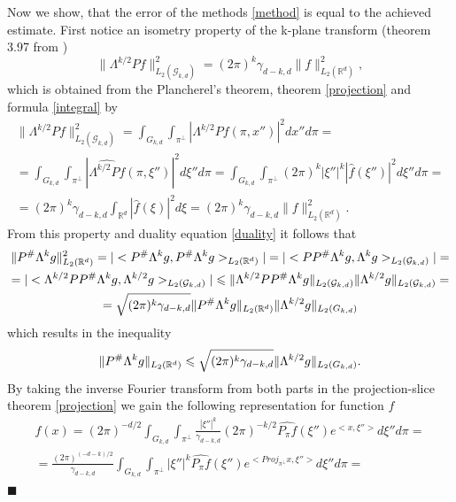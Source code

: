 \documentclass[12pt]{iopart}
\newenvironment{proof}
{\par\noindent{\bf Proof}}
{\hfill$\scriptstyle\blacksquare$}
\begin{document}
\begin{proof}
		Now we show, that the error of the methods \eqref{method} is equal to the achieved estimate. First notice an isometry property of the k-plane transform (theorem 3.97 from \cite{MA})
		$$\|\Lambda^{k/2}Pf\|^2_{L_2(\mathcal G_{k,d})}=(2\pi)^k\gamma_{d-k,d}\|f\|^2_{L_2(\mathbb R^d)},$$
		which is obtained from the Plancherel's theorem, theorem \ref{projection} and formula \eqref{integral} by    
		\begin{multline*}
		\|\Lambda^{k/2}Pf\|^2_{L_2(\mathcal G_{k,d})}=\int_{G_{k,d}}\int_{\pi^\perp}\left|\Lambda^{k/2}Pf(\pi,x'')\right|^2dx''d\pi=\\
		=\int_{G_{k,d}}\int_{\pi^\perp}\left|\widehat{\Lambda^{k/2}Pf}(\pi,\xi'')\right|^2d\xi''d\pi=\int_{G_{k,d}}\int_{\pi^\perp}(2\pi)^k|\xi''|^k\left|\widehat{f}(\xi'')\right|^2d\xi''d\pi=\\
		=(2\pi)^k\gamma_{d-k,d}\int_{\mathbb R^d}\left|\widehat{f}(\xi)\right|^2d\xi =(2\pi)^k\gamma_{d-k,d}\|f\|^2_{L_2(\mathbb R^d)}.
		\end{multline*}
		From this property and duality equation \eqref{duality} it follows that
		\begin{multline*}
		\|P^\#\Lambda^kg\|_{L_2(\mathbb R^d)}^2=|<P^\#\Lambda^kg,P^\#\Lambda^kg>_{L_2(\mathbb R^d)}|=|<PP^\#\Lambda^kg,\Lambda^kg>_{L_2(\mathcal G_{k,d})}|=\\
		=|<\Lambda^{k/2}PP^\#\Lambda^kg,\Lambda^{k/2}g>_{L_2(\mathcal G_{k,d})}|\leqslant\|\Lambda^{k/2}PP^\#\Lambda^kg\|_{L_2(\mathcal G_{k,d})}\|\Lambda^{k/2}g\|_{L_2(\mathcal G_{k,d})}=\\
		=\sqrt{(2\pi)^k\gamma_{d-k,d}}\|P^\#\Lambda^kg\|_{L_2(\mathbb R^d)}\|\Lambda^{k/2}g\|_{L_2(\mathbb \mathcal G_{k,d})}
		\end{multline*}
		which results in the inequality
		\begin{equation}
		\label{ineq}
		\|P^\#\Lambda^kg\|_{L_2(\mathbb R^d)}\leqslant\sqrt{(2\pi)^k\gamma_{d-k,d}}\|\Lambda^{k/2}g\|_{L_2(\mathbb \mathcal G_{k,d})}.
		\end{equation}
		By taking the inverse Fourier transform from both parts in the projection-slice theorem \ref{projection} we gain the following representation for function $f$
		\begin{multline*}
		f(x) = (2\pi)^{-d/2}\int_{G_{k,d}}\int_{\pi^\perp}\frac{|\xi''|^k}{\gamma_{d-k,d}}(2\pi)^{-k/2}\widehat{P_\pi f}(\xi'')e^{<x,\xi''>}d\xi''d\pi = \\
		= \frac{(2\pi)^{(-d-k)/2}}{\gamma_{d-k,d}}\int_{G_{k,d}}\int_{\pi^\perp}|\xi''|^k\widehat{P_\pi f}(\xi'')e^{<Proj_{\pi^\perp}x,\xi''>}d\xi''d\pi = \\

\end{multline*}
\end{proof}
\end{document}
